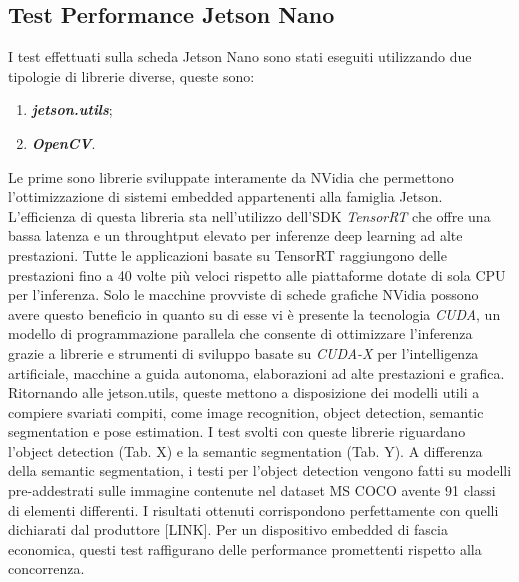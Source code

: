 \subsection{Test Performance Jetson Nano}
I test effettuati sulla scheda Jetson Nano sono stati eseguiti utilizzando due 
tipologie di librerie diverse, queste sono:
\begin{enumerate}
    \item {\bfseries{\emph{jetson.utils}}};
    \item {\bfseries{\emph{OpenCV}}}.
\end{enumerate}
Le prime sono librerie sviluppate interamente da NVidia che permettono l'ottimizzazione di sistemi embedded appartenenti alla famiglia Jetson. L'efficienza di questa libreria sta nell'utilizzo dell'SDK \emph{TensorRT} che offre una bassa latenza e un throughtput elevato per inferenze deep learning ad alte prestazioni. Tutte le applicazioni basate su TensorRT raggiungono delle prestazioni fino a 40 volte più veloci rispetto alle piattaforme dotate di sola CPU per l'inferenza. Solo le macchine provviste di schede grafiche NVidia possono avere questo beneficio in quanto su di esse vi è presente la tecnologia \emph{CUDA}, un modello di programmazione parallela che consente di ottimizzare l'inferenza grazie a librerie e strumenti di sviluppo basate su \emph{CUDA-X} per l'intelligenza artificiale, macchine a guida autonoma, elaborazioni ad alte prestazioni e grafica. Ritornando alle jetson.utils, queste mettono a disposizione dei modelli utili a compiere svariati compiti, come image recognition, object detection, semantic segmentation e pose estimation. 
I test svolti con queste librerie riguardano l'object detection (Tab. X) e la semantic segmentation (Tab. Y). A differenza della semantic segmentation, i testi per l'object detection vengono fatti su modelli pre-addestrati sulle immagine contenute nel dataset MS COCO avente 91 classi di elementi differenti. I risultati ottenuti corrispondono perfettamente con quelli dichiarati dal produttore [LINK]. Per un dispositivo embedded di fascia economica, questi test raffigurano delle performance promettenti rispetto alla concorrenza.

